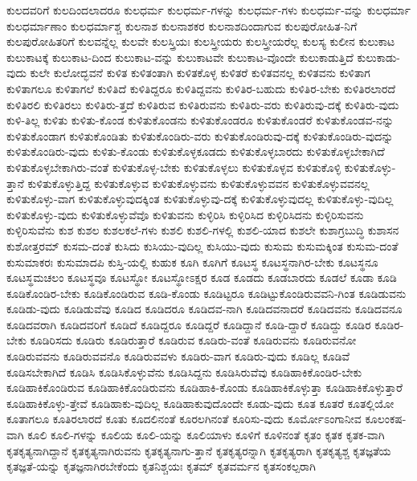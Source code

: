 {ಕುಲದವರಿಗೆ
ಕುಲದಿಂದಲಾದರೂ
ಕುಲಧರ್ಮ
ಕುಲಧರ್ಮ-ಗಳನ್ನು
ಕುಲಧರ್ಮ-ಗಳು
ಕುಲಧರ್ಮ-ವನ್ನು
ಕುಲಧರ್ಮಾ
ಕುಲಧರ್ಮಾಣಾಂ
ಕುಲಧರ್ಮಾಶ್ಚ
ಕುಲನಾಶ
ಕುಲನಾಶಕರ
ಕುಲನಾಶದಿಂದಾಗುವ
ಕುಲಪುರೋಹಿತ-ನಿಗೆ
ಕುಲಪುರೋಹಿತರಿಗೆ
ಕುಲವನ್ನೆಲ್ಲ
ಕುಲವೇ
ಕುಲಸ್ತ್ರಿಯಃ
ಕುಲಸ್ತ್ರೀಯರು
ಕುಲಸ್ತ್ರೀಯರೆಲ್ಲ
ಕುಲಸ್ಯ
ಕುಲೀನ
ಕುಲುಕಾಟ
ಕುಲುಕಾಟಕ್ಕೆ
ಕುಲುಕಾಟ-ದಿಂದ
ಕುಲುಕಾಟ-ವನ್ನು
ಕುಲುಕಾಟವೇ
ಕುಲುಕಾಟ-ವೊಂದೇ
ಕುಲುಕಾಡುತ್ತಿದೆ
ಕುಲುಕಾಡು-ವುದು
ಕುಲೇ
ಕುಲೋದ್ಭವನೆ
ಕುಳಿತ
ಕುಳಿತಂತಾಗಿ
ಕುಳಿತಕೊಳ್ಳ
ಕುಳಿತರೆ
ಕುಳಿತವನಲ್ಲ
ಕುಳಿತವನು
ಕುಳಿತಾಗ
ಕುಳಿತಾಗಲೂ
ಕುಳಿತಾಗಲೆ
ಕುಳಿತಿದೆ
ಕುಳಿತಿದ್ದರೂ
ಕುಳಿತಿದ್ದವನು
ಕುಳಿತಿರ-ಬಹುದು
ಕುಳಿತಿರ-ಬೇಕು
ಕುಳಿತಿರಲಾರದೆ
ಕುಳಿತಿರಲಿ
ಕುಳಿತಿರಲು
ಕುಳಿತಿರು-ತ್ತದೆ
ಕುಳಿತಿರುವ
ಕುಳಿತಿರುವನು
ಕುಳಿತಿರು-ವರು
ಕುಳಿತಿರುವು-ದಕ್ಕೆ
ಕುಳಿತಿರು-ವುದು
ಕುಳಿ-ತಿಲ್ಲ
ಕುಳಿತು
ಕುಳಿತು-ಕೊಂಡ
ಕುಳಿತುಕೊಂಡನು
ಕುಳಿತುಕೊಂಡರೂ
ಕುಳಿತುಕೊಂಡರೆ
ಕುಳಿತುಕೊಂಡವ-ನನ್ನು
ಕುಳಿತುಕೊಂಡಾಗ
ಕುಳಿತುಕೊಂಡಿತು
ಕುಳಿತುಕೊಂಡಿರು-ವರು
ಕುಳಿತುಕೊಂಡಿರುವು-ದಕ್ಕೆ
ಕುಳಿತುಕೊಂಡಿರು-ವುದನ್ನು
ಕುಳಿತುಕೊಂಡಿರು-ವುದು
ಕುಳಿತು-ಕೊಂಡು
ಕುಳಿತುಕೊಳ್ಳಕೂಡದು
ಕುಳಿತುಕೊಳ್ಳಬಾರದು
ಕುಳಿತುಕೊಳ್ಳಬೇಕಾಗಿದೆ
ಕುಳಿತುಕೊಳ್ಳಬೇಕಾಗಿರು-ವಂತೆ
ಕುಳಿತುಕೊಳ್ಳ-ಬೇಕು
ಕುಳಿತುಕೊಳ್ಳಲು
ಕುಳಿತುಕೊಳ್ಳವ
ಕುಳಿತುಕೊಳ್ಳಿ
ಕುಳಿತುಕೊಳ್ಳು-ತ್ತಾನೆ
ಕುಳಿತುಕೊಳ್ಳುತ್ತಿದ್ದ
ಕುಳಿತುಕೊಳ್ಳುವ
ಕುಳಿತುಕೊಳ್ಳುವನು
ಕುಳಿತುಕೊಳ್ಳುವವನ
ಕುಳಿತುಕೊಳ್ಳುವವನಲ್ಲ
ಕುಳಿತುಕೊಳ್ಳು-ವಾಗ
ಕುಳಿತುಕೊಳ್ಳುವುದಕ್ಕಿಂತ
ಕುಳಿತುಕೊಳ್ಳುವು-ದಕ್ಕೆ
ಕುಳಿತುಕೊಳ್ಳುವುದಲ್ಲ
ಕುಳಿತುಕೊಳ್ಳು-ವುದಿಲ್ಲ
ಕುಳಿತುಕೊಳ್ಳು-ವುದು
ಕುಳಿತುಕೊಳ್ಳುವೆವೊ
ಕುಳಿತುವನು
ಕುಳ್ಳಿರಿಸಿ
ಕುಳ್ಳಿರಿಸಿದ
ಕುಳ್ಳಿರಿಸಿದನು
ಕುಳ್ಳಿರಿಸುವನು
ಕುಳ್ಳಿರಿಸುವೆನು
ಕುಶ
ಕುಶಲ
ಕುಶಲಕಲೆ-ಗಳು
ಕುಶಲಿ
ಕುಶಲಿ-ಗಳಲ್ಲಿ
ಕುಶಲಿ-ಯಾದ
ಕುಶಲೇ
ಕುಶಾಗ್ರಬುದ್ಧಿ
ಕುಶಾಸನ
ಕುಶೋತ್ತರಮ್
ಕುಸಮ-ದಂತೆ
ಕುಸಿದು
ಕುಸಿಯು-ವುದಿಲ್ಲ
ಕುಸಿಯು-ವುದು
ಕುಸುಮ
ಕುಸುಮಕ್ಕಿಂತ
ಕುಸುಮ-ದಂತೆ
ಕುಸುಮಾಕರಃ
ಕುಸುಮಾದಪಿ
ಕುಸ್ತಿ-ಯಲ್ಲಿ
ಕುಹುಕ
ಕೂಗಿ
ಕೂಗಿಗೆ
ಕೂಟಸ್ಥ
ಕೂಟಸ್ಥನಾಗಿರ-ಬೇಕು
ಕೂಟಸ್ಥನೂ
ಕೂಟಸ್ಥಮಚಲಂ
ಕೂಟಸ್ಥವೂ
ಕೂಟಸ್ಥೋ
ಕೂಟಸ್ಥೋಽಕ್ಷರ
ಕೂಡ
ಕೂಡದು
ಕೂಡಬಾರದು
ಕೂಡಲೆ
ಕೂಡಾ
ಕೂಡಿ
ಕೂಡಿಕೊಂಡಿರ-ಬೇಕು
ಕೂಡಿಕೊಂಡಿರುವ
ಕೂಡಿ-ಕೊಂಡು
ಕೂಡಿಟ್ಟರೂ
ಕೂಡಿಟ್ಟುಕೊಂಡಿರುವವನಿ-ಗಿಂತ
ಕೂಡಿಡುವನು
ಕೂಡಿಡು-ವುದು
ಕೂಡಿಡುವೆವು
ಕೂಡಿದ
ಕೂಡಿದರೂ
ಕೂಡಿದವ-ನಾಗಿ
ಕೂಡಿದವನಾದರೆ
ಕೂಡಿದವನು
ಕೂಡಿದವನೂ
ಕೂಡಿದವರಾಗಿ
ಕೂಡಿದವರಿಗೆ
ಕೂಡಿದೆ
ಕೂಡಿದ್ದರೂ
ಕೂಡಿದ್ದರೆ
ಕೂಡಿದ್ದಾನೆ
ಕೂಡಿ-ದ್ದಾರೆ
ಕೂಡಿದ್ದು
ಕೂಡಿರ
ಕೂಡಿರ-ಬೇಕು
ಕೂಡಿರಿಸದು
ಕೂಡಿರು
ಕೂಡಿರುತ್ತಾರೆ
ಕೂಡಿರುವ
ಕೂಡಿರು-ವಂತೆ
ಕೂಡಿರುವನು
ಕೂಡಿರುವನೋ
ಕೂಡಿರುವವನು
ಕೂಡಿರುವವನೊ
ಕೂಡಿರುವವಳು
ಕೂಡಿರು-ವಾಗ
ಕೂಡಿರು-ವುದು
ಕೂಡಿಲ್ಲ
ಕೂಡಿವೆ
ಕೂಡಿಸಬೇಕಾಗಿದೆ
ಕೂಡಿಸಿ
ಕೂಡಿಸಿಕೊಳ್ಳುವೆನು
ಕೂಡಿಸಿದ್ದನು
ಕೂಡಿಸಿರುವೆವು
ಕೂಡಿಹಾಕಿಕೊಂಡಿರ-ಬೇಕು
ಕೂಡಿಹಾಕಿಕೊಂಡಿರುವ
ಕೂಡಿಹಾಕಿಕೊಂಡಿರುವನು
ಕೂಡಿಹಾಕಿ-ಕೊಂಡು
ಕೂಡಿಹಾಕಿಕೊಳ್ಳುತ್ತಾ
ಕೂಡಿಹಾಕಿಕೊಳ್ಳುತ್ತಾರೆ
ಕೂಡಿಹಾಕಿಕೊಳ್ಳು-ತ್ತೇವೆ
ಕೂಡಿಹಾಕು-ವುದಿಲ್ಲ
ಕೂಡಿಹಾಕುವುದೊಂದೇ
ಕೂಡು-ವುದು
ಕೂತ
ಕೂತರೆ
ಕೂತಲ್ಲಿಯೋ
ಕೂತಾಗಲೂ
ಕೂತಿರಲಾರದೆ
ಕೂತು
ಕೂದಲಿನಂತೆ
ಕೂರಲಗಿನಂತೆ
ಕೂರಿಸು-ವುದು
ಕೂರ್ಮೋಽಂಗಾನೀವ
ಕೂಲಂಕಷ-ವಾಗಿ
ಕೂಲಿ
ಕೂಲಿ-ಗಳನ್ನು
ಕೂಲಿಯ
ಕೂಲಿ-ಯನ್ನು
ಕೂಲಿಯಾಳು
ಕೂಳಿಗೆ
ಕೂಳಿನಂತೆ
ಕೃತಂ
ಕೃತಕ
ಕೃತಕ-ವಾಗಿ
ಕೃತಕೃತ್ಯನಾಗಿದ್ದಾನೆ
ಕೃತಕೃತ್ಯನಾಗಿರುವನು
ಕೃತಕೃತ್ಯನಾಗು-ತ್ತಾನೆ
ಕೃತಕೃತ್ಯರನ್ನಾಗಿ
ಕೃತಕೃತ್ಯರಾಗಿ
ಕೃತಕೃತ್ಯಶ್ಚ
ಕೃತಜ್ಞತೆಯ
ಕೃತಜ್ಞತೆ-ಯನ್ನು
ಕೃತಜ್ಞನಾಗಿರಬೇಕೆಂದು
ಕೃತನಿಶ್ಚಯಃ
ಕೃತಮ್
ಕೃತವರ್ಮನ
ಕೃತಸಂಕಲ್ಪರಾಗಿ
}
